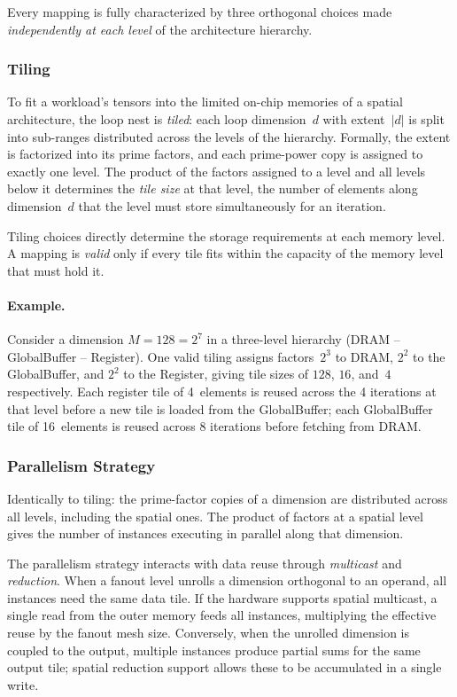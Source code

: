 Every mapping is fully characterized by three orthogonal choices made
\emph{independently at each level} of the architecture hierarchy.

\subsubsection{Tiling}
\label{sec:tiling}

To fit a workload's tensors into the limited on-chip memories of a
spatial architecture, the loop nest is \emph{tiled}: each loop
dimension~$d$ with extent~$|d|$ is split into sub-ranges distributed
across the levels of the hierarchy.
Formally, the extent is factorized into its prime factors, and each
prime-power copy is assigned to exactly one level.
The product of the factors assigned to a level and all levels below it
determines the \emph{tile size} at that level, the number of elements
along dimension~$d$ that the level must store simultaneously for an iteration.

Tiling choices directly determine the storage requirements at each
memory level.
A mapping is \emph{valid} only if every tile fits within the capacity
of the memory level that must hold it.

\paragraph{Example.}
Consider a dimension $M = 128 = 2^7$ in a three-level hierarchy
(DRAM -- GlobalBuffer -- Register).
One valid tiling assigns factors~$2^3$ to DRAM, $2^2$ to the
GlobalBuffer, and $2^2$ to the Register, giving tile sizes of
$128$, $16$, and~$4$ respectively.
Each register tile of 4~elements is reused across the 4 iterations
at that level before a new tile is loaded from the GlobalBuffer; each
GlobalBuffer tile of 16~elements is reused across 8 iterations before
fetching from DRAM.

\subsubsection{Parallelism Strategy}
\label{sec:parallelism}

Identically to tiling: the prime-factor copies of a
dimension are distributed across all levels, including the spatial
ones.
The product of factors at a spatial level gives the number of
instances executing in parallel along that dimension.

The parallelism strategy interacts with data reuse through
\emph{multicast} and \emph{reduction}.
When a fanout level unrolls a dimension orthogonal to an operand,
all instances need the same data tile.
If the hardware supports spatial multicast, a single read from
the outer memory feeds all instances, multiplying the effective
reuse by the fanout mesh size.
Conversely, when the unrolled dimension is coupled to the output,
multiple instances produce partial sums for the same output tile;
spatial reduction support allows these to be accumulated in a single
write.

